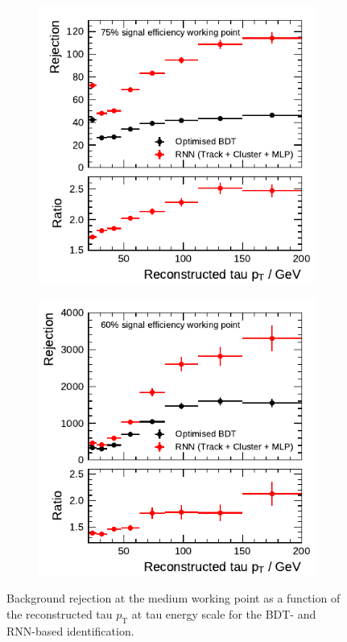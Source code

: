 \begin{figure}[htb]
  \begin{subfigure}[t]{0.48\textwidth}
    \centering
    \includegraphics{./figures/rnn/combined/rnn_medium_1p.pdf}
  \end{subfigure}\hfill
  \begin{subfigure}[t]{0.48\textwidth}
    \centering
    \includegraphics{./figures/rnn/combined/rnn_medium_3p.pdf}
  \end{subfigure}
  \caption{Background rejection at the medium working point as a function of the
    reconstructed tau $p_\text{T}$ at tau energy scale for the BDT- and
    RNN-based identification.}
\end{figure}

